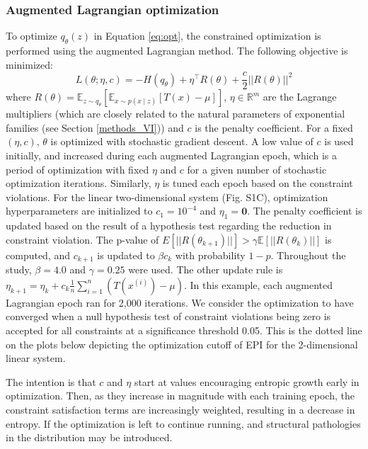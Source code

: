 \documentclass[11pt]{article}
\begin{document}
\subsubsection{Augmented Lagrangian optimization}\label{methods_AL_opt}
To optimize $q_\theta(z)$ in Equation \ref{eq:opt}, the constrained optimization is performed using the augmented Lagrangian method.  The following objective is minimized:
\begin{equation}
L(\theta; \eta, c) = -H(q_\theta) + \eta^\top R(\theta) + \frac{c}{2}||R(\theta)||^2
\end{equation}
where $R(\theta) = \mathbb{E}_{z \sim q_\theta}\left[ \mathbb{E}_{x\sim p(x \mid z)}\left[T(x) - \mu \right] \right]$, $\eta \in \mathbb{R}^m$ are the Lagrange multipliers (which are closely related to the natural parameters of exponential families (see Section \ref{methods_VI})) and $c$ is the penalty coefficient.  For a fixed $(\eta, c)$, $\theta$ is optimized with stochastic gradient descent.  A low value of $c$ is used initially, and increased during each augmented Lagrangian epoch, which is a period of optimization with fixed $\eta$ and $c$ for a given number of stochastic optimization iterations. Similarly, $\eta$ is tuned each epoch based on the constraint violations.  For the linear two-dimensional system (Fig. S1C), optimization hyperparameters are initialized to $c_1 = 10^{-4}$ and $\eta_1 = \textbf{0}$.  The penalty coefficient is updated based on the result of a hypothesis test regarding the reduction in constraint violation.  The p-value of $E[||R(\theta_{k+1})||] > \gamma \mathbb{E} \left[||R(\theta_{k})|| \right]$ is computed, and $c_{k+1}$ is updated  to $\beta c_k$ with probability $1-p$.  Throughout the study, $\beta = 4.0$ and $\gamma = 0.25$ were used.  The other update rule is $\eta_{k+1} = \eta_k + c_k \frac{1}{n} \sum_{i=1}^n (T(x^{(i)}) - \mu)$.  In this example, each augmented Lagrangian epoch ran for 2,000 iterations.  We consider the optimization to have converged when a null hypothesis test of constraint violations being zero is accepted for all constraints at a significance threshold 0.05.  This is the dotted line on the plots below depicting the optimization cutoff of EPI for the 2-dimensional linear system.

The intention is that $c$ and $\eta$ start at values encouraging entropic growth early in optimization.  Then, as they increase in magnitude with each training epoch, the constraint satisfaction terms are increasingly weighted, resulting in a decrease in entropy.   
If the optimization is left to continue running, and structural pathologies in the distribution may be introduced.
\end{document}

